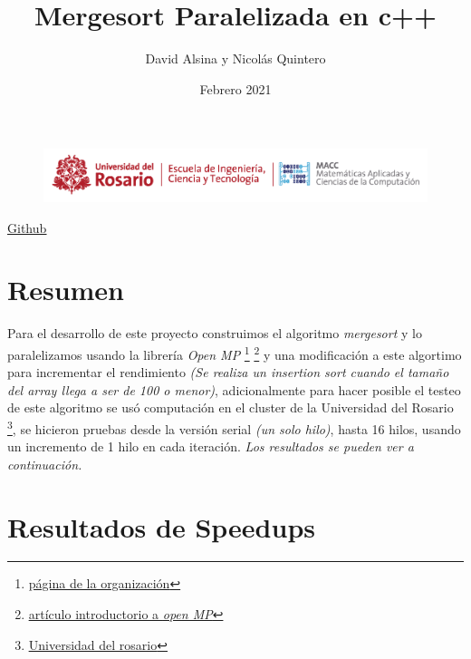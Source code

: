 \documentclass[a4paper,12pt]{article}
\title{\textcolor{blueMacc}{Mergesort Paralelizada en c++}}
\author{David Alsina y Nicolás Quintero}
\date{Febrero 2021}
\begin{document}
    \begin{figure}[ht]
        \centering
        \includegraphics[width = 17cm]{Header.png}
        \maketitle
    \end{figure}
    
    \href{https://github.com/juannico007/talleres_c.paralela.git}{\textcolor{blueMacc}{\underline{Github}}} 
    
    \section{Resumen}
    
    Para el desarrollo de este proyecto construimos el algoritmo \textit{mergesort} y lo paralelizamos usando la librería \textit{Open MP}
    \footnote{\href{https://www.openmp.org/}{\textcolor{blueMacc}{\underline{página de la organización}}}}
    \footnote{\href{https://medium.com/swlh/introduction-to-the-openmp-with-c-and-some-integrals-approximation-a7f03e9ebb65}{\textcolor{blueMacc}{\underline{artículo introductorio a \textit{open MP}}}}} y una modificación a este algortimo para incrementar el rendimiento \textit{(Se realiza un insertion sort cuando el tamaño del array llega a ser de 100 o menor)},
    adicionalmente para hacer posible el testeo de este algoritmo se usó computación en el cluster de la Universidad del Rosario \footnote{\textcolor{blueMacc}{\underline{\href{https://www.urosario.edu.co/}{Universidad del rosario}}}}, se hicieron pruebas desde la versión serial \textit{(un solo hilo)}, hasta 16 hilos, usando un incremento de 1 hilo en cada iteración. \textit{Los resultados se pueden ver a continuación.}
    
    \newpage
    
    \section{Resultados de Speedups}
    
\end{document}
